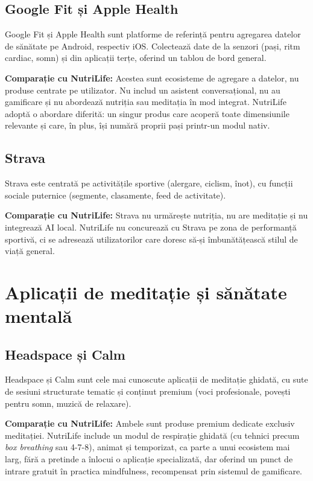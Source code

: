 \documentclass[12pt, a4paper, twoside]{report}
\numberwithin{equation}{section}
\begin{document}
\subsection{Google Fit și Apple Health}

Google Fit și Apple Health sunt platforme de referință pentru agregarea datelor de sănătate
pe Android, respectiv iOS. Colectează date de la senzori (pași, ritm cardiac, somn) și din
aplicații terțe, oferind un tablou de bord general.

\textbf{Comparație cu NutriLife:} Acestea sunt ecosisteme de agregare a datelor, nu produse
centrate pe utilizator. Nu includ un asistent conversațional, nu au gamificare și nu
abordează nutriția sau meditația în mod integrat. NutriLife adoptă o abordare diferită: un
singur produs care acoperă toate dimensiunile relevante și care, în plus, își numără proprii
pași printr-un modul nativ.

\subsection{Strava}

Strava este centrată pe activitățile sportive (alergare, ciclism, înot), cu funcții sociale
puternice (segmente, clasamente, feed de activitate).

\textbf{Comparație cu NutriLife:} Strava nu urmărește nutriția, nu are meditație și nu
integrează AI local. NutriLife nu concurează cu Strava pe zona de performanță sportivă, ci
se adresează utilizatorilor care doresc să-și îmbunătățească stilul de viață general.

\section{Aplicații de meditație și sănătate mentală}

\subsection{Headspace și Calm}

Headspace și Calm sunt cele mai cunoscute aplicații de meditație ghidată, cu sute de sesiuni
structurate tematic și conținut premium (voci profesionale, povești pentru somn, muzică de
relaxare).

\textbf{Comparație cu NutriLife:} Ambele sunt produse premium dedicate exclusiv meditației.
NutriLife include un modul de respirație ghidată (cu tehnici precum \textit{box breathing}
sau 4-7-8), animat și temporizat, ca parte a unui ecosistem mai larg, fără a pretinde a
înlocui o aplicație specializată, dar oferind un punct de intrare gratuit în practica
mindfulness, recompensat prin sistemul de gamificare.
\end{document}
